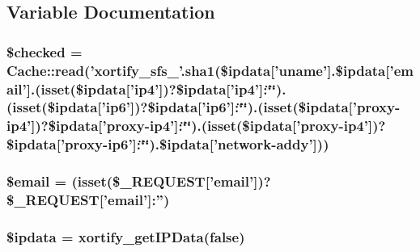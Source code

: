 \subsection{Variable Documentation}
\hypertarget{stopforumspam_8com_2post_8loader_8php_aae831eeaf71994cc7e31c1412a29f6fd}{
\subsubsection[{\$checked}]{\setlength{\rightskip}{0pt plus 5cm}\$checked = {\bf Cache\-::read}('xortify\-\_\-sfs\-\_\-'.sha1(\$ipdata\mbox{[}'uname'\mbox{]}.\$ipdata\mbox{[}'email'\mbox{]}.(isset(\$ipdata\mbox{[}'ip4'\mbox{]})?\$ipdata\mbox{[}'ip4'\mbox{]}\-:\char`\"{}\char`\"{}).(isset(\$ipdata\mbox{[}'ip6'\mbox{]})?\$ipdata\mbox{[}'ip6'\mbox{]}\-:\char`\"{}\char`\"{}).(isset(\$ipdata\mbox{[}'proxy-\/ip4'\mbox{]})?\$ipdata\mbox{[}'proxy-\/ip4'\mbox{]}\-:\char`\"{}\char`\"{}).(isset(\$ipdata\mbox{[}'proxy-\/ip4'\mbox{]})?\$ipdata\mbox{[}'proxy-\/ip6'\mbox{]}\-:\char`\"{}\char`\"{}).\$ipdata\mbox{[}'network-\/addy'\mbox{]}))}}\label{stopforumspam_8com_2post_8loader_8php_aae831eeaf71994cc7e31c1412a29f6fd}
\hypertarget{stopforumspam_8com_2post_8loader_8php_ad634f418b20382e2802f80532d76d3cd}{
\subsubsection[{\$email}]{\setlength{\rightskip}{0pt plus 5cm}\$email = (isset(\$\-\_\-\-R\-E\-Q\-U\-E\-S\-T\mbox{[}'email'\mbox{]})?\$\-\_\-\-R\-E\-Q\-U\-E\-S\-T\mbox{[}'email'\mbox{]}\-:'')}}\label{stopforumspam_8com_2post_8loader_8php_ad634f418b20382e2802f80532d76d3cd}
\hypertarget{stopforumspam_8com_2post_8loader_8php_a2538b33e5d86382acfcd6fc288dedbb0}{
\subsubsection[{\$ipdata}]{\setlength{\rightskip}{0pt plus 5cm}\$ipdata = xortify\-\_\-get\-I\-P\-Data(false)}}\label{stopforumspam_8com_2post_8loader_8php_a2538b33e5d86382acfcd6fc288dedbb0}
